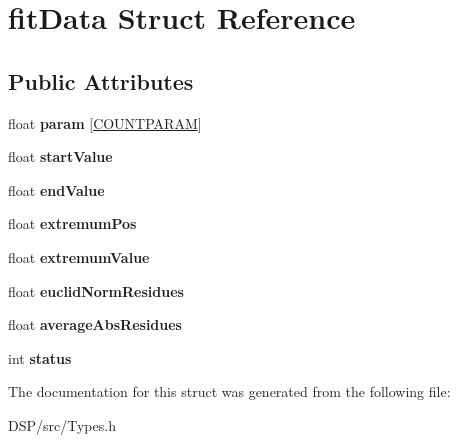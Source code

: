 \hypertarget{structfitData}{\section{fit\-Data Struct Reference}
\label{structfitData}
}
\subsection*{Public Attributes}
\begin{DoxyCompactItemize}
\item 
\hypertarget{structfitData_a9dc59837acfda1ff57f3c8c450c4b34f}{float {\bfseries param} \mbox{[}\hyperlink{Constants_8h_a0df66aec82cc118ec8978ce882abea1c}{C\-O\-U\-N\-T\-P\-A\-R\-A\-M}\mbox{]}}\label{structfitData_a9dc59837acfda1ff57f3c8c450c4b34f}

\item 
\hypertarget{structfitData_a43ca55a48f87d4ee4b56b967f42b2d20}{float {\bfseries start\-Value}}\label{structfitData_a43ca55a48f87d4ee4b56b967f42b2d20}

\item 
\hypertarget{structfitData_a5378631adb5adbf16fce978a23ee274e}{float {\bfseries end\-Value}}\label{structfitData_a5378631adb5adbf16fce978a23ee274e}

\item 
\hypertarget{structfitData_a49e033dcf62bab8507d9c48944f12ec3}{float {\bfseries extremum\-Pos}}\label{structfitData_a49e033dcf62bab8507d9c48944f12ec3}

\item 
\hypertarget{structfitData_a496cb36cda36d83a894b0862ad9197ce}{float {\bfseries extremum\-Value}}\label{structfitData_a496cb36cda36d83a894b0862ad9197ce}

\item 
\hypertarget{structfitData_ac3410d59c7f6fe2c1b646ebc54ca050c}{float {\bfseries euclid\-Norm\-Residues}}\label{structfitData_ac3410d59c7f6fe2c1b646ebc54ca050c}

\item 
\hypertarget{structfitData_af9ce188fcd02cb73d523cc21b5570f51}{float {\bfseries average\-Abs\-Residues}}\label{structfitData_af9ce188fcd02cb73d523cc21b5570f51}

\item 
\hypertarget{structfitData_a3da54e3b439a7153caf422556b57686e}{int {\bfseries status}}\label{structfitData_a3da54e3b439a7153caf422556b57686e}

\end{DoxyCompactItemize}


The documentation for this struct was generated from the following file\-:\begin{DoxyCompactItemize}
\item 
D\-S\-P/src/Types.\-h\end{DoxyCompactItemize}
